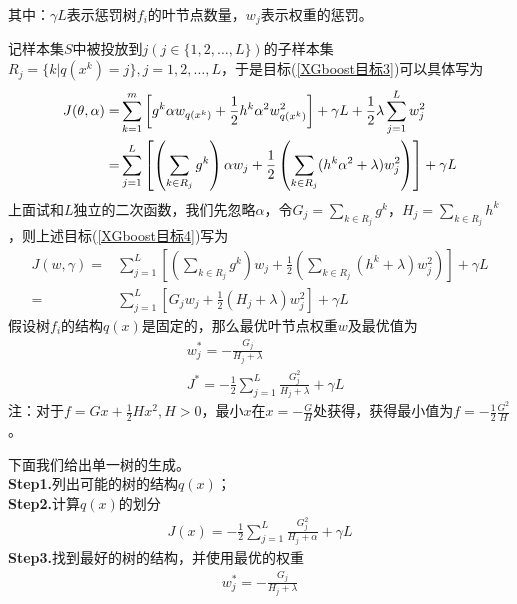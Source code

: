           其中：$\gamma L$表示惩罚树$f_i$的叶节点数量，$w_j$表示权重的惩罚。
          \par
          记样本集$S$中被投放到$j(j\in \{1,2,\dots,L\})$的子样本集$R_j = \{k|q(x^k) = j\},j = 1,2,\dots,L$，于是目标(\ref{XGboost目标3})可以具体写为
          \begin{align}
          \label{XGboost目标4}
          J(\theta,\alpha) =& \sum_{k=1}^m \left[ g^k \alpha w_{q(x^k)} + \frac{1}{2} h^k\alpha^2w^2_{q(x^k)} \right] + \gamma L + \frac{1}{2}\lambda \sum_{j=1}^L w_j^2 \notag \\
          =&\sum_{j=1}^L \left[ \left( \sum_{k\in R_j}g^k \right) \alpha w_j+\frac{1}{2} \left( \sum_{k\in R_j}(h^k\alpha^2 +\lambda)w_j^2 \right)   \right]+\gamma L
          \end{align}
          上面试和$L$独立的二次函数，我们先忽略$\alpha$，令$G_j = \sum_{k\in R_j}g^k$，$H_j = \sum_{k\in R_j}h^k$，则上述目标(\ref{XGboost目标4})写为
          \begin{align*}
          J(w,\gamma) =&  \sum_{j=1}^L \left[ \left( \sum_{k\in R_j}g^k \right)  w_j+\frac{1}{2} \left( \sum_{k\in R_j}(h^k +\lambda)w_j^2 \right)   \right]+\gamma L\\
          =& \sum_{j=1}^L \left[G_jw_j +\frac{1}{2}(H_j+\lambda)w_j^2\right]+\gamma L
          \end{align*}
          假设树$f_i$的结构$q(x)$是固定的，那么最优叶节点权重$w$及最优值为
          \begin{align*}
          & w_j^* = - \frac{G_j}{H_j+\lambda}\\
          & J^* = -\frac{1}{2} \sum_{j=1}^L \frac{G_j^2}{H_j+\lambda}+\gamma L
          \end{align*}
          注：对于$f = Gx + \frac{1}{2}Hx^2,H>0$，最小$x$在$x = -\frac{G}{H}$处获得，获得最小值为$f = -\frac{1}{2}\frac{G^2}{H}$。
          \par
          下面我们给出单一树的生成。\\
          \textbf{Step1.}列出可能的树的结构$q(x)$；\\
          \textbf{Step2.}计算$q(x)$的划分
          \begin{align*}
          J(x) = -\frac{1}{2}\sum_{j=1}^L \frac{G_j^2}{H_j+\alpha} + \gamma L
          \end{align*}
          \textbf{Step3.}找到最好的树的结构，并使用最优的权重
          \begin{align*}
          w_j^* = -\frac{G_j}{H_j+\lambda}
          \end{align*}
